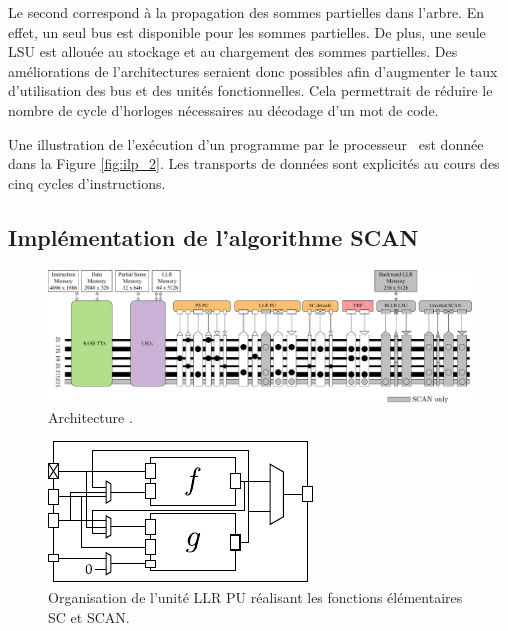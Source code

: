 Le second correspond à la propagation des sommes partielles dans l'arbre. En effet, un seul bus est disponible pour les sommes partielles. De plus, une seule LSU est allouée au stockage et au chargement des sommes partielles. Des améliorations de l'architectures seraient donc possibles afin d'augmenter le taux d'utilisation des bus et des unités fonctionnelles. Cela permettrait de réduire le nombre de cycle d'horloges nécessaires au décodage d'un mot de code.

Une illustration de l'exécution d'un programme par le processeur \TTSC~est donnée dans la Figure \ref{fig:ilp_2}. Les transports de données sont explicités au cours des cinq cycles d'instructions.



\subsection{Implémentation de l'algorithme SCAN}

\begin{figure}[htp]
	\centering
	\includegraphics[width=\textwidth]{main/ch4_fig/archi_scan}
	\caption{Architecture \TTSCAN.}
	\label{fig:tt_scan}
\end{figure}
\begin{figure}[htp]
\centering
\includegraphics[scale=1.5]{main/ch4_fig/scan_unit}
\caption{Organisation de l'unité \og LLR PU \fg réalisant les fonctions élémentaires SC et SCAN.}
\label{fig:scan_unit}
\end{figure}

